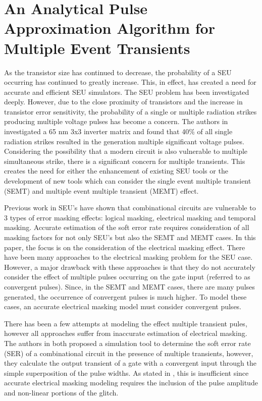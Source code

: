 
\chapter{An Analytical Pulse Approximation Algorithm for Multiple Event Transients} \label{ch2}

As the transistor size has continued to decrease, the probability of a SEU occurring has continued to greatly increase. This, in effect, has created a need for accurate and efficient SEU simulators. The SEU problem has been investigated deeply. \cite{MARS_C,SERA,FASER} However, due to the close proximity of transistors and the increase in transistor error sensitivity, the probability of a single or multiple radiation strikes producing multiple voltage pulses has become a concern. The authors in \cite{Harada} investigated a 65 nm 3x3 inverter matrix and found that 40\% of all single radiation strikes resulted in the generation multiple significant voltage pulses. Considering the possibility that a modern circuit is also vulnerable to multiple simultaneous strike, there is a significant concern for multiple transients. This creates the need for either the enhancement of existing SEU tools or the development of new tools which can consider the single event multiple transient (SEMT) and multiple event multiple transient (MEMT) effect.

Previous work in SEU’s have shown that combinational circuits are vulnerable to 3 types of error masking effects: logical masking, electrical masking and temporal masking. Accurate estimation of the soft error rate requires consideration of all masking factors for not only SEU’s but also the SEMT and MEMT cases. In this paper, the focus is on the consideration of the electrical masking effect. There have been many approaches to the electrical masking problem for the SEU case. \cite{Omana_Trap,Accurate_Masking,Weibull} However, a major drawback with these approaches is that they do not accurately consider the effect of multiple pulses occurring on the gate input (referred to as convergent pulses). Since, in the SEMT and MEMT cases, there are many pulses generated, the occurrence of convergent pulses is much higher. To model these cases, an accurate electrical masking model must consider convergent pulses. 

There has been a few attempts at modeling the effect multiple transient pules, however all approaches suffer from inaccurate estimation of electrical masking. The authors in \cite{METSys,TahooriMET} both proposed a simulation tool to determine the soft error rate (SER) of a combinational circuit in the presence of multiple transients, however, they calculate the output transient of a gate with a convergent input through the simple superposition of the pulse widths. As stated in \cite{Accurate_Masking}, this is insufficient since accurate electrical masking modeling requires the inclusion of the pulse amplitude and non-linear portions of the glitch.

